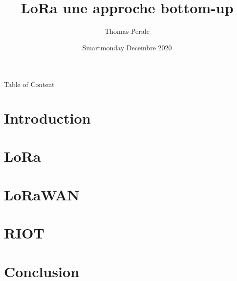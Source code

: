 \documentclass{beamer}
\title{LoRa une approche bottom-up}
\subtitle{}
\author{Thomas Perale}
\date{Smartmonday Decembre 2020}
\begin{document}
\frame{\maketitle}

\begin{frame}{Table of Content}
    \tableofcontents
\end{frame}

\section{Introduction}



\section{LoRa}



\section{LoRaWAN}



\section{RIOT}



\section{Conclusion}




\end{document}
